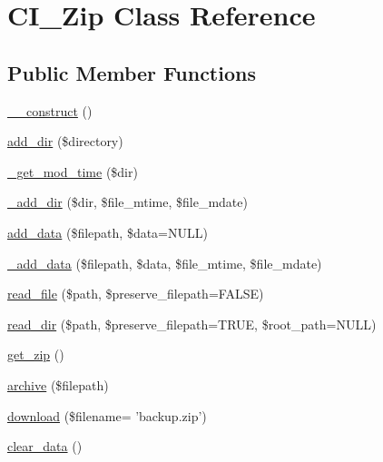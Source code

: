 \hypertarget{class_c_i___zip}{\section{C\-I\-\_\-\-Zip Class Reference}
\label{class_c_i___zip}
}
\subsection*{Public Member Functions}
\begin{DoxyCompactItemize}
\item 
\hyperlink{class_c_i___zip_a095c5d389db211932136b53f25f39685}{\-\_\-\-\_\-construct} ()
\item 
\hyperlink{class_c_i___zip_a86b6a309dad105e43b446dc9f8820703}{add\-\_\-dir} (\$directory)
\item 
\hyperlink{class_c_i___zip_a2e4a669b246619934060ea323b99b332}{\-\_\-get\-\_\-mod\-\_\-time} (\$dir)
\item 
\hyperlink{class_c_i___zip_aacd1bc7175638298e01bd6c16bccfbe6}{\-\_\-add\-\_\-dir} (\$dir, \$file\-\_\-mtime, \$file\-\_\-mdate)
\item 
\hyperlink{class_c_i___zip_a8d541e6609a5b2634a6a2bc7731465a5}{add\-\_\-data} (\$filepath, \$data=N\-U\-L\-L)
\item 
\hyperlink{class_c_i___zip_a4ff8a5ea57979ec1a44cc9e443acf26d}{\-\_\-add\-\_\-data} (\$filepath, \$data, \$file\-\_\-mtime, \$file\-\_\-mdate)
\item 
\hyperlink{class_c_i___zip_af32859ac9a7db39f291e6316c6e943d5}{read\-\_\-file} (\$path, \$preserve\-\_\-filepath=F\-A\-L\-S\-E)
\item 
\hyperlink{class_c_i___zip_a296847a86d7cf0e4bba9b71a173cfffe}{read\-\_\-dir} (\$path, \$preserve\-\_\-filepath=T\-R\-U\-E, \$root\-\_\-path=N\-U\-L\-L)
\item 
\hyperlink{class_c_i___zip_a263fd906f99ccca15a12fe34a79656e4}{get\-\_\-zip} ()
\item 
\hyperlink{class_c_i___zip_a935879d7074c751a4ac886aebd66cbd4}{archive} (\$filepath)
\item 
\hyperlink{class_c_i___zip_a485d204dc928fd19b711cb857e44561f}{download} (\$filename= 'backup.\-zip')
\item 
\hyperlink{class_c_i___zip_a89d046bac0ab06a81c5c03d55b4bcae5}{clear\-\_\-data} ()
\end{DoxyCompactItemize}
